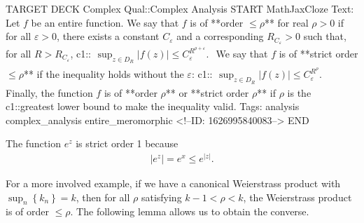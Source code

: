 \documentclass{memoir}
\begin{document}
\begin{anki}
TARGET DECK
Complex Qual::Complex Analysis
START
MathJaxCloze
Text: Let \(f\) be an entire function. We say that \(f\) is of **order \(\leq \rho \)** for real \(\rho >0\) if for all \(\varepsilon>0\), there exists a constant \(C_\varepsilon\) and a corresponding \(R_{C_\varepsilon} >0\) such that, for all \(R>R_{C_\varepsilon}\),
{{c1::\(\begin{align*}
      	\sup_{z \in D_R} \left| f(z) \right| \leq C_\varepsilon^{R^{\rho +\varepsilon}} .
        \end{align*}\)}}
We say that \(f\) is of **strict order \(\leq \rho \)** if the inequality holds without the \(\varepsilon\):
{{c1::\(\begin{align*}
        	\sup_{z \in D_R} \left| f(z) \right| \leq C_\varepsilon^{R^{\rho} }.
        \end{align*}\)}}
Finally, the function \(f\) is of **order \(\rho \)** or **strict order \(\rho \)** if \(\rho \) is the {{c1::greatest lower bound}} to make the inequality valid.
Tags: analysis complex_analysis entire_meromorphic
<!--ID: 1626995840083-->
END
\end{anki}


\begin{exmp}
	The function \(e^{z}\) is strict order 1 because
	\begin{align*}
		\left| e^{z} \right| = e^{x} \leq e^{\left| z \right| }.
	\end{align*}
\end{exmp}

For a more involved example, if we have a canonical Weierstrass product with \(\sup_{n} \left\{ k_n \right\} =k\), then for all \(\rho \) satisfying \(k-1<\rho <k\), the Weierstrass product is of order \(\leq \rho \). The following lemma allows us to obtain the converse.
\end{document}
